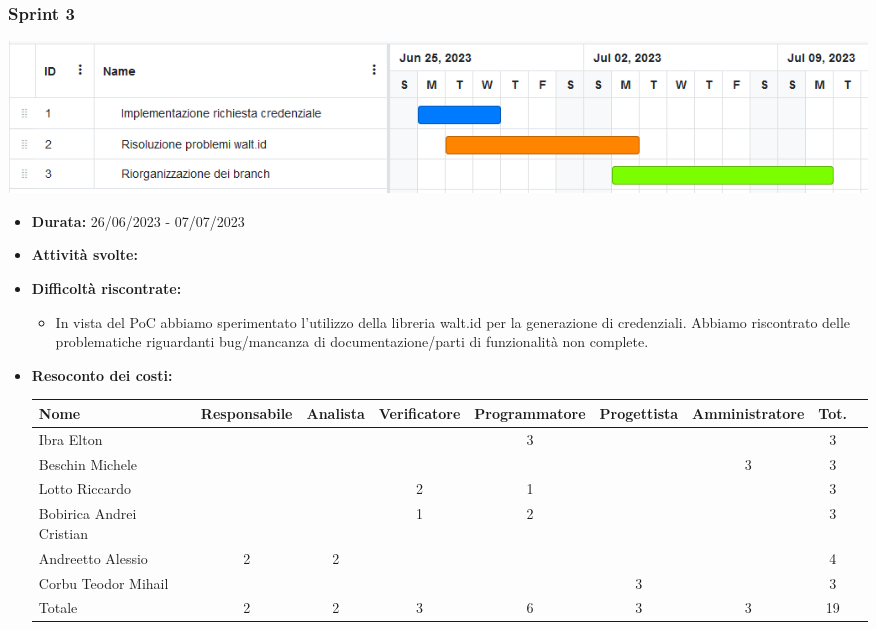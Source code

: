 \subsubsection{Sprint 3}
\begin{center}
    \includegraphics[scale = 0.5]{./res/img/Sprint_3.png}
  \end{center}
\begin{itemize}
    \item \textbf{Durata:} 26/06/2023 - 07/07/2023 
    \item \textbf{Attività svolte:} 
    \item \textbf{Difficoltà riscontrate:}
    \begin{itemize}
        \item In vista del PoC abbiamo sperimentato l’utilizzo della libreria walt.id per la generazione di credenziali.
        Abbiamo riscontrato delle problematiche riguardanti bug/mancanza di documentazione/parti di funzionalità non complete.
    \end{itemize}
    \item \textbf{Resoconto dei costi:}
    \begin{longtable}{|p{}|c|c|c|c|c|c|c|c|}
        \hline
        Nome & Responsabile & Analista & Verificatore & Programmatore & Progettista & Amministratore & Tot.\\
        \hline
        Ibra Elton & & & &3 & & &3\\
        \hline
        Beschin Michele & & & & & &3 &3 \\
        \hline
        Lotto Riccardo & & &2 &1 & & &3 \\
        \hline
        Bobirica Andrei Cristian & & &1 &2 & & &3 \\
        \hline
        Andreetto Alessio &2 &2 & & & & &4 \\
        \hline
        Corbu Teodor Mihail & & & & &3 & &3 \\
        \hline
        Totale &2 &2 &3 &6 &3 &3 &19 \\
        \hline
    \end{longtable}
    \end{itemize}

